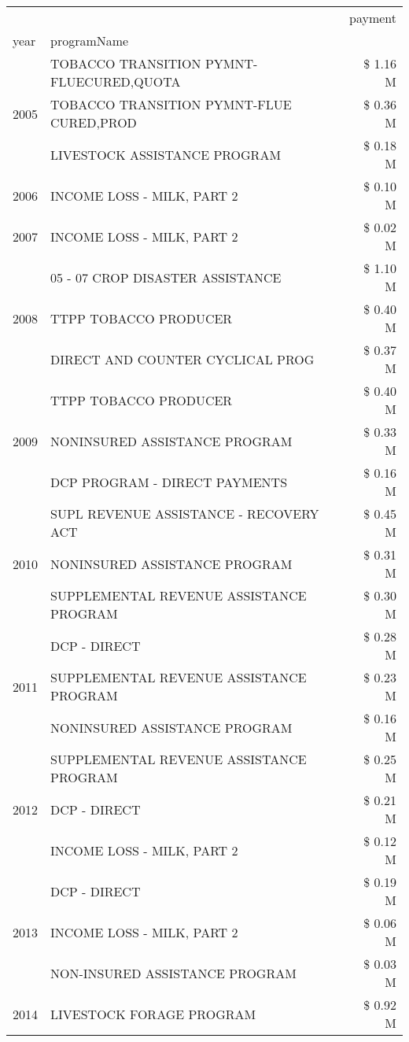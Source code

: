 \begin{tabular}{llr}
\toprule
 &  & payment \\
year & programName &  \\
\midrule
\multirow[t]{3}{*}{2005} & TOBACCO TRANSITION PYMNT-FLUECURED,QUOTA & \$ 1.16 M \\
 & TOBACCO TRANSITION PYMNT-FLUE CURED,PROD & \$ 0.36 M \\
 & LIVESTOCK ASSISTANCE PROGRAM & \$ 0.18 M \\
\cline{1-3}
2006 & INCOME LOSS - MILK, PART 2 & \$ 0.10 M \\
\cline{1-3}
2007 & INCOME LOSS - MILK, PART 2 & \$ 0.02 M \\
\cline{1-3}
\multirow[t]{3}{*}{2008} & 05 - 07 CROP DISASTER ASSISTANCE & \$ 1.10 M \\
 & TTPP TOBACCO PRODUCER & \$ 0.40 M \\
 & DIRECT AND COUNTER CYCLICAL PROG & \$ 0.37 M \\
\cline{1-3}
\multirow[t]{3}{*}{2009} & TTPP TOBACCO PRODUCER & \$ 0.40 M \\
 & NONINSURED ASSISTANCE PROGRAM & \$ 0.33 M \\
 & DCP PROGRAM - DIRECT PAYMENTS & \$ 0.16 M \\
\cline{1-3}
\multirow[t]{3}{*}{2010} & SUPL REVENUE ASSISTANCE - RECOVERY ACT & \$ 0.45 M \\
 & NONINSURED ASSISTANCE PROGRAM & \$ 0.31 M \\
 & SUPPLEMENTAL REVENUE ASSISTANCE PROGRAM & \$ 0.30 M \\
\cline{1-3}
\multirow[t]{3}{*}{2011} & DCP - DIRECT & \$ 0.28 M \\
 & SUPPLEMENTAL REVENUE ASSISTANCE PROGRAM & \$ 0.23 M \\
 & NONINSURED ASSISTANCE PROGRAM & \$ 0.16 M \\
\cline{1-3}
\multirow[t]{3}{*}{2012} & SUPPLEMENTAL REVENUE ASSISTANCE PROGRAM & \$ 0.25 M \\
 & DCP - DIRECT & \$ 0.21 M \\
 & INCOME LOSS - MILK, PART 2 & \$ 0.12 M \\
\cline{1-3}
\multirow[t]{3}{*}{2013} & DCP - DIRECT & \$ 0.19 M \\
 & INCOME LOSS - MILK, PART 2 & \$ 0.06 M \\
 & NON-INSURED ASSISTANCE PROGRAM & \$ 0.03 M \\
\cline{1-3}
\multirow[t]{3}{*}{2014} & LIVESTOCK FORAGE PROGRAM & \$ 0.92 M \\

\end{tabular}
